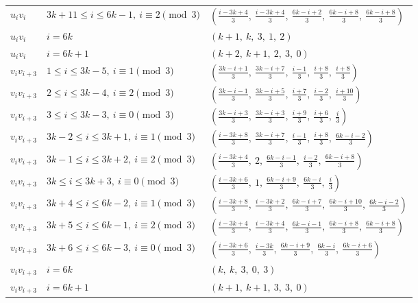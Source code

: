 \begin{longtable}{lll}
$u_i v_i$ & $3k+11 \le i \le 6k-1,\ i \equiv 2 \pmod{3}$ & $(\frac{i-3k+4}{3},\ \frac{i-3k+4}{3},\ \frac{6k-i+2}{3},\ \frac{6k-i+8}{3},\ \frac{6k-i+8}{3})$ \\
$u_i v_i$ & $i = 6k$ & $(k+1,\ k,\ 3,\ 1,\ 2)$ \\
$u_i v_i$ & $i = 6k+1$ & $(k+2,\ k+1,\ 2,\ 3,\ 0)$ \\
$v_i v_{i+3}$ & $1 \le i \le 3k-5,\ i \equiv 1 \pmod{3}$ & $(\frac{3k-i+1}{3},\ \frac{3k-i+7}{3},\ \frac{i-1}{3},\ \frac{i+8}{3},\ \frac{i+8}{3})$ \\
$v_i v_{i+3}$ & $2 \le i \le 3k-4,\ i \equiv 2 \pmod{3}$ & $(\frac{3k-i-1}{3},\ \frac{3k-i+5}{3},\ \frac{i+7}{3},\ \frac{i-2}{3},\ \frac{i+10}{3})$ \\
$v_i v_{i+3}$ & $3 \le i \le 3k-3,\ i \equiv 0 \pmod{3}$ & $(\frac{3k-i+3}{3},\ \frac{3k-i+3}{3},\ \frac{i+9}{3},\ \frac{i+6}{3},\ \frac{i}{3})$ \\
$v_i v_{i+3}$ & $3k-2 \le i \le 3k+1,\ i \equiv 1 \pmod{3}$ & $(\frac{i-3k+8}{3},\ \frac{3k-i+7}{3},\ \frac{i-1}{3},\ \frac{i+8}{3},\ \frac{6k-i-2}{3})$ \\
$v_i v_{i+3}$ & $3k-1 \le i \le 3k+2,\ i \equiv 2 \pmod{3}$ & $(\frac{i-3k+4}{3},\ 2,\ \frac{6k-i-1}{3},\ \frac{i-2}{3},\ \frac{6k-i+8}{3})$ \\
$v_i v_{i+3}$ & $3k \le i \le 3k+3,\ i \equiv 0 \pmod{3}$ & $(\frac{i-3k+6}{3},\ 1,\ \frac{6k-i+9}{3},\ \frac{6k-i}{3},\ \frac{i}{3})$ \\
$v_i v_{i+3}$ & $3k+4 \le i \le 6k-2,\ i \equiv 1 \pmod{3}$ & $(\frac{i-3k+8}{3},\ \frac{i-3k+2}{3},\ \frac{6k-i+7}{3},\ \frac{6k-i+10}{3},\ \frac{6k-i-2}{3})$ \\
$v_i v_{i+3}$ & $3k+5 \le i \le 6k-1,\ i \equiv 2 \pmod{3}$ & $(\frac{i-3k+4}{3},\ \frac{i-3k+4}{3},\ \frac{6k-i-1}{3},\ \frac{6k-i+8}{3},\ \frac{6k-i+8}{3})$ \\
$v_i v_{i+3}$ & $3k+6 \le i \le 6k-3,\ i \equiv 0 \pmod{3}$ & $(\frac{i-3k+6}{3},\ \frac{i-3k}{3},\ \frac{6k-i+9}{3},\ \frac{6k-i}{3},\ \frac{6k-i+6}{3})$ \\
$v_i v_{i+3}$ & $i = 6k$ & $(k,\ k,\ 3,\ 0,\ 3)$ \\
$v_i v_{i+3}$ & $i = 6k+1$ & $(k+1,\ k+1,\ 3,\ 3,\ 0)$ \\
\hline
\end{longtable}
\clearpage
